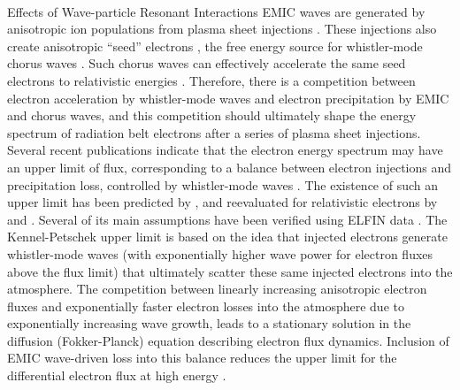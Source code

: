 \documentclass[
  letterpaper,
  DIV=11,
  numbers=noendperiod]{scrartcl}
\makeatletter
\let\oldparagraph\paragraph
\renewcommand{\paragraph}{
    \@ifstar
      \xxxParagraphStar
      \xxxParagraphNoStar
  }
\newcommand{\xxxParagraphStar}[1]{\oldparagraph*{#1}\mbox{}}
\newcommand{\xxxParagraphNoStar}[1]{\oldparagraph{#1}\mbox{}}
\makeatother
\begin{document}
\paragraph{Effects of Wave-particle Resonant Interactions}\label{effects-of-wave-particle-resonant-interactions}
EMIC waves are generated by anisotropic ion populations from plasma sheet injections \citep{Jun19:emic}. These injections also create anisotropic ``seed'' electrons \citep{Miyoshi13,Jaynes15:seedelectrons}, the free energy source for whistler-mode chorus waves \citep{Tao11,Fu14:radiation_belts,Zhang18:whistlers&injections}. Such chorus waves can effectively accelerate the same seed electrons to relativistic energies \citep{miyoshiRebuildingProcessOuter2003, thorneRapidLocalAcceleration2013, mourenasApproximateAnalyticalSolutions2014, allisonLocalHeatingRadiation2020}. Therefore, there is a competition between electron acceleration by whistler-mode waves \citep[supported by direct adiabatic heating during injections, see, e.g.][]{sorathiaModelingDepletionRecovery2018} and electron precipitation by EMIC and chorus waves, and this competition should ultimately shape the energy spectrum of radiation belt electrons after a series of plasma sheet injections. Several recent publications indicate that the electron energy spectrum may have an upper limit of flux, corresponding to a balance between electron injections and precipitation loss, controlled by whistler-mode waves \citep{oliferTaleTwoRadiation2021, oliferNaturalLimitSpectral2022}. The existence of such an upper limit has been predicted by \citet{kennelLimitStablyTrapped1966}, and reevaluated for relativistic electrons by \citet{summersLimitStablyTrapped2009} and \citet{summersLimitingEnergySpectrum2014}. Several of its main assumptions have been verified using ELFIN data \citep{mourenasCheckingKeyAssumptions2024}. The Kennel-Petschek upper limit is based on the idea that injected electrons generate whistler-mode waves (with exponentially higher wave power for electron fluxes above the flux limit) that ultimately scatter these same injected electrons into the atmosphere. The competition between linearly increasing anisotropic electron fluxes and exponentially faster electron losses into the atmosphere due to exponentially increasing wave growth, leads to a stationary solution in the diffusion (Fokker-Planck) equation describing electron flux dynamics. Inclusion of EMIC wave-driven loss into this balance reduces the upper limit for the differential electron flux at high energy \citep{mourenasExtremeEnergySpectra2022}.
\end{document}

